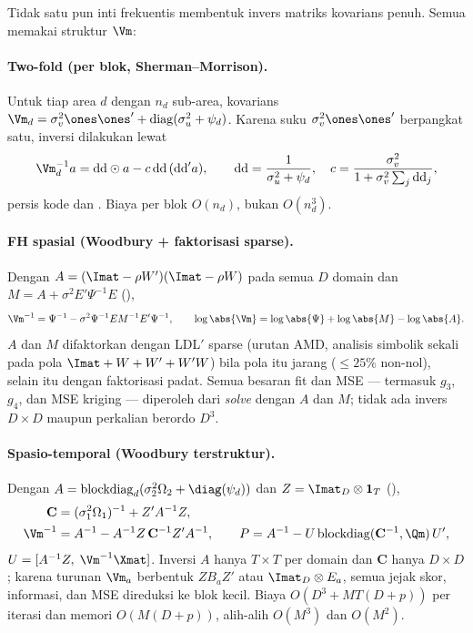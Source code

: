Tidak satu pun inti frekuentis membentuk invers matriks kovarians penuh. Semua
memakai struktur $\Vm$:

\paragraph{Two-fold (per blok, Sherman--Morrison).}
Untuk tiap area $d$ dengan $n_d$ sub-area, kovarians
$\Vm_d=\sigma_v^2\ones\ones'+\mathrm{diag}(\sigma_u^2+\psi_d)$.
Karena suku $\sigma_v^2\ones\ones'$ berpangkat satu, inversi dilakukan lewat
\begin{equation}
  \Vm_d^{-1}a=\mathrm{dd}\odot a-c\,\mathrm{dd}\,(\mathrm{dd}'a),
  \qquad
  \mathrm{dd}=\frac{1}{\sigma_u^2+\psi_d},\quad
  c=\frac{\sigma_v^2}{1+\sigma_v^2\sum_j \mathrm{dd}_j},
  \label{eq:woodbury-tfh}
\end{equation}
persis kode  dan . Biaya per blok
$O(n_d)$, bukan $O(n_d^3)$.

\paragraph{FH spasial (Woodbury + faktorisasi sparse).}
Dengan $A=(\Imat-\rho W')(\Imat-\rho W)$ pada semua $D$ domain dan
$M=A+\sigma^2E'\Psi^{-1}E$ (),
\begin{equation}
  \Vm^{-1}=\Psi^{-1}-\sigma^2\Psi^{-1}EM^{-1}E'\Psi^{-1},\qquad
  \log\abs{\Vm}=\log\abs{\Psi}+\log\abs{M}-\log\abs{A}.
  \label{eq:woodbury-sfh}
\end{equation}
$A$ dan $M$ difaktorkan dengan LDL$'$ sparse  (urutan AMD,
analisis simbolik sekali pada pola $\Imat+W+W'+W'W$) bila pola itu jarang
($\le25\%$ non-nol), selain itu dengan faktorisasi padat. Semua besaran fit
dan MSE --- termasuk $g_3$, $g_4$, dan MSE kriging --- diperoleh dari
\emph{solve} dengan $A$ dan $M$; tidak ada invers $D\times D$ maupun perkalian
berordo $D^3$.

\paragraph{Spasio-temporal (Woodbury terstruktur).}
Dengan $A=\mathrm{blockdiag}_d(\sigma_2^2\Omega_2+\diag(\psi_d))$ dan
$Z=\Imat_D\otimes\mathbf 1_T$ (),
\begin{align}
  \mathbf C &= (\sigma_1^2\Omega_1)^{-1}+Z'A^{-1}Z,
    \label{eq:woodbury-c}\\
  \Vm^{-1} &= A^{-1}-A^{-1}Z\,\mathbf C^{-1}Z'A^{-1},\qquad
  P=A^{-1}-U\,\mathrm{blockdiag}(\mathbf C^{-1},\Qm)\,U',
    \label{eq:woodbury-v}
\end{align}
$U=[A^{-1}Z,\;\Vm^{-1}\Xmat]$. Inversi $A$ hanya $T\times T$ per domain dan
$\mathbf C$ hanya $D\times D$; karena turunan $\Vm_a$ berbentuk $ZB_aZ'$ atau
$\Imat_D\otimes E_a$, semua jejak skor, informasi, dan MSE direduksi ke blok
kecil. Biaya $O(D^3+MT(D+p))$ per iterasi dan memori $O(M(D+p))$, alih-alih
$O(M^3)$ dan $O(M^2)$.

